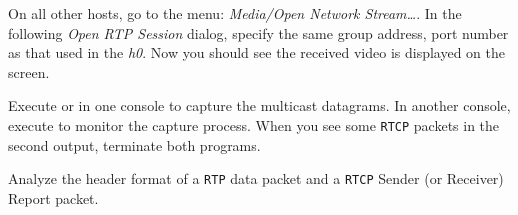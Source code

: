 \documentclass{../UTNetLab}
\begin{document}
    On all other hosts, go to the  menu: \textit{Media/Open Network Stream\ldots}.
    In the following \textit{Open RTP Session} dialog, specify the same group address, port number as that used in the \textit{h0}.%
    Now you should see the received video is displayed on the screen.

    Execute  or  in one console to capture the multicast datagrams.
    In another console, execute  to monitor the capture process.
    When you see some \texttt{RTCP} packets in the second  output, terminate both  programs.

    Analyze the header format of a \texttt{RTP} data packet and a \texttt{RTCP} Sender (or Receiver) Report packet.
\end{document}
